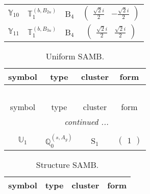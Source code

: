 \documentclass[fleqn,10pt,landscape]{article}
\begin{document}
\begin{itemize}
\begin{center}
\begin{longtable}{c|c|c|c}
$ \mathbb{Y}_{10} $ & $\mathbb{T}_{1}^{(b,B_{2u})}$ & B$_{4}$ & $\begin{pmatrix} \frac{\sqrt{2} i}{2} & - \frac{\sqrt{2} i}{2} \end{pmatrix}$ \\
$ \mathbb{Y}_{11} $ & $\mathbb{T}_{1}^{(b,B_{3u})}$ & B$_{4}$ & $\begin{pmatrix} \frac{\sqrt{2} i}{2} & \frac{\sqrt{2} i}{2} \end{pmatrix}$ \\
\end{longtable}
\end{center}
\begin{center}
\renewcommand{\arraystretch}{1.3}
\begin{longtable}{c|c|c|c}
\caption{Uniform SAMB.}
 \\
 \hline \hline
symbol & type & cluster & form \\ \hline \endfirsthead

\multicolumn{3}{l}{\tablename\ \thetable{}} \\
 \hline \hline
symbol & type & cluster & form \\ \hline \endhead

 \hline \hline
\multicolumn{3}{r}{\footnotesize\it continued ...} \\ \endfoot

 \hline \hline
\multicolumn{3}{r}{} \\ \endlastfoot

$ \mathbb{U}_{1} $ & $\mathbb{Q}_{0}^{(s,A_{g})}$ & S$_{1}$ & $\begin{pmatrix} 1 \end{pmatrix}$ \\
\end{longtable}
\end{center}
\begin{center}
\renewcommand{\arraystretch}{1.3}
\begin{longtable}{c|c|c|c}
\caption{Structure SAMB.}
 \\
 \hline \hline
symbol & type & cluster & form \\ \hline \endfirsthead


\end{longtable}
\end{center}
\end{itemize}
\end{document}
